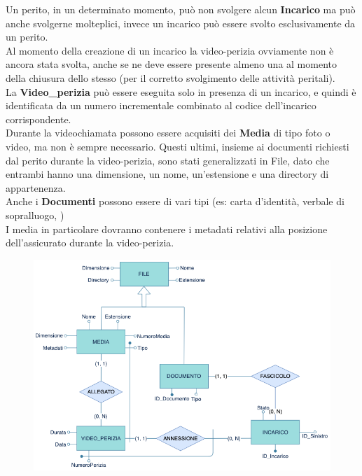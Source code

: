 \documentclass[a4paper,12pt]{report}
\begin{document}
Un perito, in un determinato momento, può non svolgere alcun \textbf{Incarico} ma può anche svolgerne molteplici, invece un incarico può essere svolto esclusivamente da un perito.
\\
Al momento della creazione di un incarico la video-perizia ovviamente non è ancora stata svolta, anche se ne deve essere presente almeno una al momento della chiusura dello stesso (per il corretto svolgimento delle attività peritali).
\\
La \textbf{Video\_perizia} può essere eseguita solo in presenza di un incarico, e quindi è identificata da un numero incrementale combinato al codice dell’incarico corrispondente.
\\
Durante la videochiamata possono essere acquisiti dei \textbf{Media} di tipo foto o video, ma non è sempre necessario. Questi ultimi, insieme ai documenti richiesti dal perito durante la video-perizia, sono stati generalizzati in File, dato che entrambi hanno una dimensione, un nome, un’estensione e una directory di appartenenza.
\\
Anche i \textbf{Documenti} possono essere di vari tipi (es: carta d’identità, verbale di sopralluogo, )
\\
I media in particolare dovranno contenere i metadati relativi alla posizione dell’assicurato durante la video-perizia.
\\
\begin{figure}[ht]
    \begin{center}
        \centering
        \includegraphics[width=\textwidth]{img/VideoPerizia.png}
    \end{center}
\end{figure}
\clearpage
\end{document}
